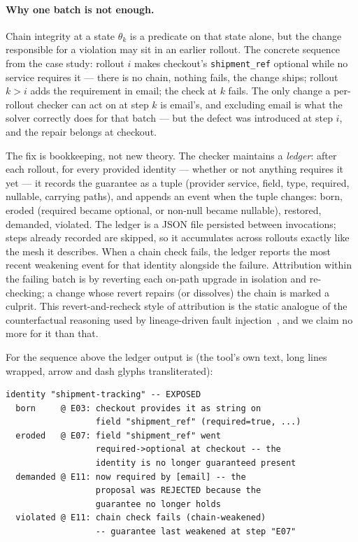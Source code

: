 \paragraph{Why one batch is not enough.}
Chain integrity at a state $\theta_k$ is a predicate on that state
alone, but the change responsible for a violation may sit in an
earlier rollout. The concrete sequence from the case study: rollout
$i$ makes checkout's \texttt{shipment\_ref} optional while no service
requires it --- there is no chain, nothing fails, the change ships;
rollout $k > i$ adds the requirement in email; the check at $k$ fails.
The only change a per-rollout checker can act on at step $k$ is
email's, and excluding email is what the solver correctly does for
that batch --- but the defect was introduced at step $i$, and the
repair belongs at checkout.

The fix is bookkeeping, not new theory. The checker maintains a
\emph{ledger}: after each rollout, for every provided identity ---
whether or not anything requires it yet --- it records the guarantee
as a tuple (provider service, field, type, required, nullable,
carrying paths), and appends an event when the tuple changes:
\textsf{born}, \textsf{eroded} (required became optional, or non-null
became nullable), \textsf{restored}, \textsf{demanded},
\textsf{violated}. The ledger is a JSON file persisted between
invocations; steps already recorded are skipped, so it accumulates
across rollouts exactly like the mesh it describes. When a chain check
fails, the ledger reports the most recent weakening event for that
identity alongside the failure. Attribution within the failing batch
is by reverting each on-path upgrade in isolation and re-checking; a
change whose revert repairs (or dissolves) the chain is marked a
culprit. This revert-and-recheck style of attribution is the static
analogue of the counterfactual reasoning used by lineage-driven fault
injection~\cite{alvaro2015lineage}, and we claim no more for it than
that.

For the sequence above the ledger output is (the tool's own text, long
lines wrapped, arrow and dash glyphs transliterated):

{\footnotesize\begin{verbatim}
identity "shipment-tracking" -- EXPOSED
  born     @ E03: checkout provides it as string on
                  field "shipment_ref" (required=true, ...)
  eroded   @ E07: field "shipment_ref" went
                  required->optional at checkout -- the
                  identity is no longer guaranteed present
  demanded @ E11: now required by [email] -- the
                  proposal was REJECTED because the
                  guarantee no longer holds
  violated @ E11: chain check fails (chain-weakened)
                  -- guarantee last weakened at step "E07"
\end{verbatim}}

